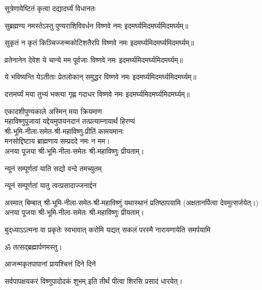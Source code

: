 \begin{center}
\begin{center}

{सूत्रेणावेष्टितं कृत्वा दद्यादर्घ्यं विधानतः}%

\medskip

{सुब्रह्मण्य नमस्तेऽस्तु पुण्यराशिविवर्धन}%
\hfill विष्णवे नमः इदमर्घ्यमिदमर्घ्यमिदमर्घ्यम्॥
\medskip

{सुकृतं न कृतं किञ्चिज्जन्मकोटिशतैरपि}%
\hfill विष्णवे नमः इदमर्घ्यमिदमर्घ्यमिदमर्घ्यम्॥
\medskip

{व्रतेनानेन देवेश ये चान्ये मम पूर्वजाः}%
\hfill विष्णवे नमः इदमर्घ्यमिदमर्घ्यमिदमर्घ्यम्॥
\medskip

{ये भविष्यन्ति येऽतीताः प्रेतलोकान् समुद्धर}%
\hfill विष्णवे नमः इदमर्घ्यमिदमर्घ्यमिदमर्घ्यम्॥
\medskip

{दत्तमर्घ्यं मया तुभ्यं भक्त्या गृह्ण गदाधर}%
\hfill विष्णवे नमः इदमर्घ्यमिदमर्घ्यमिदमर्घ्यम्॥
\medskip

\end{center}



\hiranyagarbha

एकादशीपुण्यकाले अस्मिन् मया क्रियमाण\\
महाविष्णुपूजायां यद्देयमुपायनदानं तत्प्रत्याम्नायार्थं हिरण्यं\\
श्री-भूमि-नीला-समेत-श्री-महाविष्णु-प्रीतिं कामयमानः\\
मनसोद्दिष्टाय ब्राह्मणाय सम्प्रददे नमः न मम।\\
अनया पूजया श्री-भूमि-नीला-समेतः श्री-महाविष्णुः प्रीयताम्।


{न्यूनं सम्पूर्णतां याति सद्यो वन्दे तमच्युतम्}

{न्यूनं सम्पूर्णतां यातु त्वत्प्रसादाज्जनार्द्दन}
\medskip

अस्मात् बिम्बात् श्री-भूमि-नीला-समेत-श्री-महाविष्णुं यथास्थानं प्रतिष्ठापयामि (अक्षतानर्पित्वा देवमुत्सर्जयेत्।)\\
अनया पूजया श्री-भूमि-नीला-समेतः श्री-महाविष्णुः प्रीयताम्।\medskip

{बुद्‌ध्याऽऽत्मना वा प्रकृतेः स्वभावात्}
{करोमि यद्यत् सकलं परस्मै}
{नारायणायेति समर्पयामि}

ॐ तत्सद्ब्रह्मार्पणमस्तु।\medskip

{आजन्मकृतपापानां प्रायश्चित्तं दिने दिने}

{सर्वपापक्षयकरं विष्णुपादोदकं शुभम्}
इति तीर्थं पीत्वा शिरसि प्रसादं धारयेत्।

\end{center}

